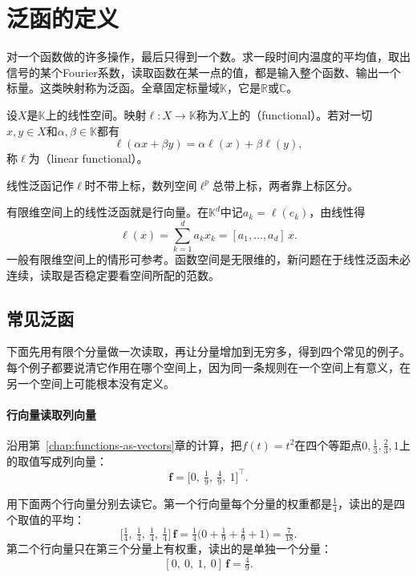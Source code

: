 \section{泛函的定义}
\label{sec:lfunc-definition}

对一个函数做的许多操作，最后只得到一个数。求一段时间内温度的平均值，取出信号的某个Fourier系数，读取函数在某一点的值，都是输入整个函数、输出一个标量。这类映射称为泛函。全章固定标量域$\mathbb K$，它是$\mathbb R$或$\mathbb C$。

\begin{definition}[泛函]
\label{def:lfunc-functional}
设$X$是$\mathbb K$上的线性空间。映射$\ell:X\to\mathbb K$称为$X$上的（functional）。若对一切$x,y\in X$和$\alpha,\beta\in\mathbb K$都有
\begin{equation}
\ell(\alpha x+\beta y)=\alpha\ell(x)+\beta\ell(y),
\label{eq:lfunc-linearity}
\end{equation}
称$\ell$为（linear functional）。
\end{definition}

线性泛函记作$\ell$时不带上标，数列空间$\ell^p$总带上标，两者靠上标区分。

有限维空间上的线性泛函就是行向量。在$\mathbb K^d$中记$a_k=\ell(e_k)$，由线性得
\[
\ell(x)=\sum_{k=1}^da_kx_k=[a_1,\ldots,a_d]\,x .
\]
一般有限维空间上的情形可参考。函数空间是无限维的，新问题在于线性泛函未必连续，读取是否稳定要看空间所配的范数。

\subsection{常见泛函}
\label{sec:lfunc-examples}

下面先用有限个分量做一次读取，再让分量增加到无穷多，得到四个常见的例子。每个例子都要说清它作用在哪个空间上，因为同一条规则在一个空间上有意义，在另一个空间上可能根本没有定义。

\paragraph{行向量读取列向量}
沿用第~\ref{chap:functions-as-vectors}章的计算，把$f(t)=t^2$在四个等距点$0,\tfrac13,\tfrac23,1$上的取值写成列向量：
\[
\bm f=\bigl[0,\ \tfrac19,\ \tfrac49,\ 1\bigr]^{\top}.
\]

用下面两个行向量分别去读它。第一个行向量每个分量的权重都是$\tfrac14$，读出的是四个取值的平均：
\[
\bigl[\tfrac14,\ \tfrac14,\ \tfrac14,\ \tfrac14\bigr]\,\bm f
=\tfrac14\bigl(0+\tfrac19+\tfrac49+1\bigr)=\tfrac7{18}.
\]
第二个行向量只在第三个分量上有权重，读出的是单独一个分量：
\[
[0,\ 0,\ 1,\ 0]\,\bm f=\tfrac49 .
\]

